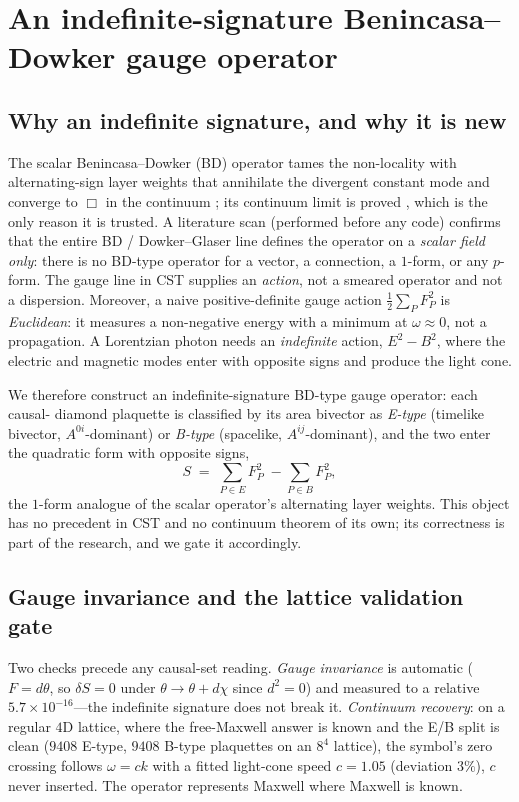 \documentclass[aps,prd,reprint,nofootinbib,superscriptaddress,floatfix]{revtex4-2}
\begin{document}
\section{An indefinite-signature Benincasa--Dowker gauge operator}\label{sec:operator}

\subsection{Why an indefinite signature, and why it is new}
The scalar Benincasa--Dowker (BD) operator tames the non-locality with
alternating-sign layer weights that annihilate the divergent constant mode and converge
to $\Box$ in the continuum \cite{BenincasaDowker2010,DowkerGlaser2013}; its continuum
limit is proved \cite{BelenchiaBenincasaDowker2016}, which is the only reason it is
trusted. A literature scan (performed before any code) confirms that the entire BD /
Dowker--Glaser line defines the operator on a \emph{scalar field only}: there is no
BD-type operator for a vector, a connection, a $1$-form, or any $p$-form. The gauge line
in CST \cite{Sverdlov2008,SverdlovBombelli2009} supplies an \emph{action}, not a smeared
operator and not a dispersion. Moreover, a naive positive-definite gauge action
$\tfrac12\sum_P F_P^2$ is \emph{Euclidean}: it measures a non-negative energy with a
minimum at $\omega\approx0$, not a propagation. A Lorentzian photon needs an
\emph{indefinite} action, $E^2-B^2$, where the electric and magnetic modes enter with
opposite signs and produce the light cone.

We therefore construct an indefinite-signature BD-type gauge operator: each causal-
diamond plaquette is classified by its area bivector as \emph{E-type} (timelike bivector,
$A^{0i}$-dominant) or \emph{B-type} (spacelike, $A^{ij}$-dominant), and the two enter the
quadratic form with opposite signs,
\begin{equation}
S \;=\; \sum_{P\in E}\!F_P^2 \;-\!\sum_{P\in B}\!F_P^2 ,
\label{eq:indef}
\end{equation}
the $1$-form analogue of the scalar operator's alternating layer weights. This object has
no precedent in CST and no continuum theorem of its own; its correctness is part of the
research, and we gate it accordingly.

\subsection{Gauge invariance and the lattice validation gate}
Two checks precede any causal-set reading. \emph{Gauge invariance} is automatic
($F=d\theta$, so $\delta S=0$ under $\theta\to\theta+d\chi$ since $d^2=0$) and measured
to a relative $5.7\times10^{-16}$---the indefinite signature does not break it.
\emph{Continuum recovery}: on a regular $4$D lattice, where the free-Maxwell answer is
known and the E/B split is clean ($9408$ E-type, $9408$ B-type plaquettes on an $8^4$
lattice), the symbol's zero crossing follows $\omega=ck$ with a fitted light-cone speed
$c=1.05$ (deviation $3\%$), $c$ never inserted. The operator represents Maxwell where
Maxwell is known.
\end{document}

